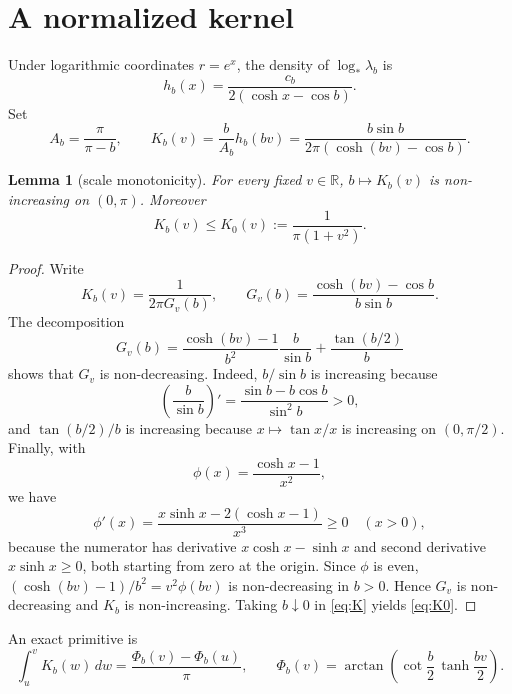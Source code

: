 \documentclass[11pt]{article}
\newtheorem{lemma}{Lemma}
\newcommand{\R}{\mathbb R}
\begin{document}
\section{A normalized kernel}

Under logarithmic coordinates $r=e^x$, the density of $\log_*\lambda_b$ is
\begin{equation}\label{eq:h}
 h_b(x)=\frac{c_b}{2(\cosh x-\cos b)}.
\end{equation}
Set
\begin{equation}\label{eq:K}
 A_b=\frac{\pi}{\pi-b},
 \qquad
 K_b(v)=\frac{b}{A_b}h_b(bv)
 =\frac{b\sin b}{2\pi(\cosh(bv)-\cos b)}.
\end{equation}

\begin{lemma}[scale monotonicity]\label{lem:monotone}
For every fixed $v\in\R$, $b\mapsto K_b(v)$ is non-increasing on $(0,\pi)$. Moreover
\begin{equation}\label{eq:K0}
 K_b(v)\le K_0(v):=\frac{1}{\pi(1+v^2)}.
\end{equation}
\end{lemma}

\begin{proof}
Write
\[
 K_b(v)=\frac{1}{2\pi G_v(b)},
 \qquad
 G_v(b)=\frac{\cosh(bv)-\cos b}{b\sin b}.
\]
The decomposition
\begin{equation}\label{eq:G-decomp}
 G_v(b)
 =\frac{\cosh(bv)-1}{b^2}\frac{b}{\sin b}
 +\frac{\tan(b/2)}{b}
\end{equation}
shows that $G_v$ is non-decreasing. Indeed, $b/\sin b$ is increasing because
\[
 \left(\frac b{\sin b}\right)'
 =\frac{\sin b-b\cos b}{\sin^2b}>0,
\]
and $\tan(b/2)/b$ is increasing because $x\mapsto \tan x/x$ is increasing on $(0,\pi/2)$. Finally, with
\[
 \phi(x)=\frac{\cosh x-1}{x^2},
\]
we have
\[
 \phi'(x)=\frac{x\sinh x-2(\cosh x-1)}{x^3}\ge0
 \quad (x>0),
\]
because the numerator has derivative $x\cosh x-\sinh x$ and second derivative $x\sinh x\ge0$, both starting from zero at the origin. Since $\phi$ is even, $(\cosh(bv)-1)/b^2=v^2\phi(bv)$ is non-decreasing in $b>0$. Hence $G_v$ is non-decreasing and $K_b$ is non-increasing. Taking $b\downarrow0$ in \eqref{eq:K} yields \eqref{eq:K0}.
\end{proof}

An exact primitive is
\begin{equation}\label{eq:primitive}
 \int_u^v K_b(w)\,dw
 =\frac{\Phi_b(v)-\Phi_b(u)}{\pi},
 \qquad
 \Phi_b(v)=\arctan\!\left(\cot\frac b2\,\tanh\frac{bv}{2}\right).
\end{equation}
\end{document}
